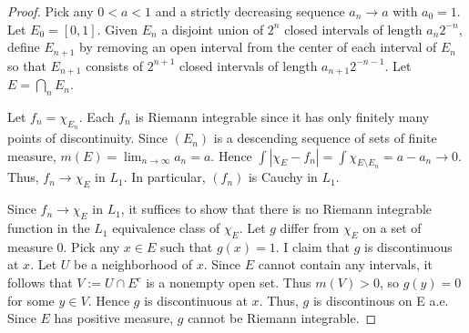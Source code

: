 \documentclass{article}
\begin{document}
\begin{proof}
Pick any $0 < a < 1$ and a strictly decreasing sequence $a_n \to a$ with $a_0 = 1$.  Let $E_0 = [0,1]$. Given $E_n$ a disjoint union of $2^n$ closed intervals of length $a_n 2^{-n}$, define $E_{n+1}$ by removing an open interval from the center of each interval of $E_n$ so that $E_{n+1}$ consists of $2^{n+1}$ closed intervals of length $a_{n+1} 2^{-n-1}$. Let $E = \bigcap_n E_n$.  

Let $f_n = \chi_{E_n}$.  Each $f_n$ is Riemann integrable since it has only finitely many points of discontinuity.  
Since $(E_n)$ is a descending sequence of sets of finite measure,  $m(E) = \lim_{n\to\infty} a_n  = a$.  Hence $\int |\chi_E - f_n| = \int \chi_{E \setminus E_n} = a - a_n \to 0$. Thus, $f_n \to \chi_E$ in $L_1$.  In particular, $(f_n)$ is Cauchy in $L_1$.

Since $f_n \to \chi_E$ in $L_1$, it suffices to show that there is no Riemann integrable function in the $L_1$ equivalence class of $\chi_E$. Let $g$ differ from $\chi_E$ on a set of measure 0.  Pick any $x \in E$ such that $g(x) = 1$.  I claim that $g$ is discontinuous at $x$.  Let $U$ be a neighborhood of $x$.  Since $E$ cannot contain any intervals, it follows that $V := U \cap E^c$ is a nonempty open set.  Thus $m(V) > 0$, so $g(y) = 0$ for some $y \in V$.  Hence $g$ is discontinuous at $x$.  Thus, $g$ is discontinous on E a.e.  Since $E$ has positive measure, $g$ cannot be Riemann integrable.
\end{proof}
\end{document}
